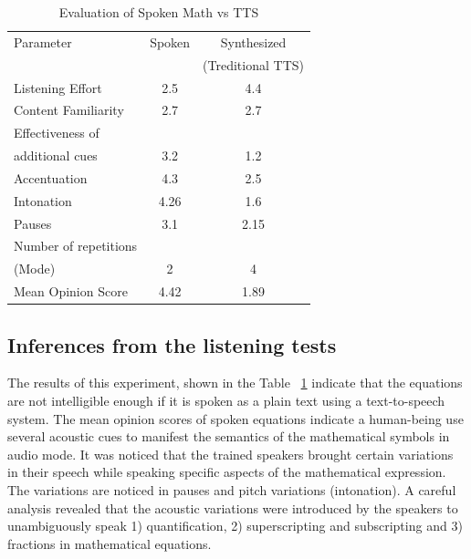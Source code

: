 \documentclass{article}
\begin{document}
\begin{table}[t]
\caption{\label{tts}Evaluation of Spoken Math vs TTS}

\vspace{8pt} %

\centering
\begin{tabular}{|l |c |c|}
\hline%
Parameter & Spoken & Synthesized  \\
                  &              & (Treditional TTS) \\[0.5ex]
\hline

Listening Effort & 2.5 & 4.4 \\
\hline
Content Familiarity &2.7 &2.7 \\
\hline
Effectiveness of & & \\
additional cues &3.2 &1.2 \\
\hline
Accentuation &4.3 &2.5 \\
\hline
Intonation & 4.26 & 1.6  \\
\hline
Pauses & 3.1 & 2.15 \\
\hline
Number of repetitions & & \\
(Mode) &2 & 4 \\
\hline
Mean Opinion Score & 4.42 & 1.89  \\%
\hline



\end{tabular}
\end{table}



\subsection{Inferences from the listening tests}
\label{ssec:basis}
The results of this experiment, shown in the Table ~\ref{tts}   indicate that the equations are not intelligible enough if it is spoken as a plain text using a text-to-speech system. The mean opinion scores of spoken equations indicate a human-being use several acoustic cues to manifest the semantics of the mathematical symbols in audio mode. It was noticed that the trained speakers brought certain variations in their speech while speaking specific aspects of the mathematical expression. The variations are noticed in pauses and pitch variations (intonation). 
A careful analysis revealed that the acoustic variations were introduced by the speakers to unambiguously speak 1) quantification, 2) superscripting and subscripting and 3) fractions in mathematical equations. 
\end{document}
